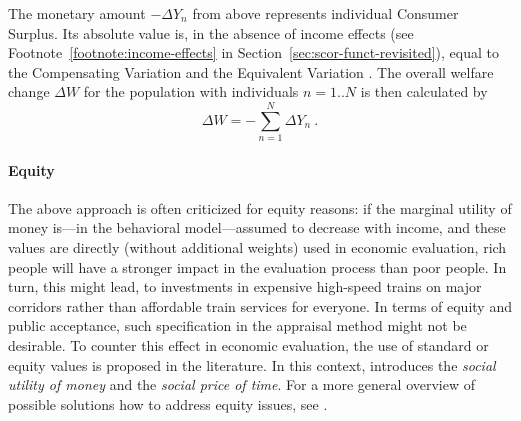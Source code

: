 
The monetary amount $ - \Delta Y_n$ from above represents individual Consumer Surplus. Its absolute value is, in the absence of income effects (see Footnote~\ref{footnote:income-effects} in Section~\ref{sec:scor-funct-revisited}), equal to the Compensating Variation and the Equivalent Variation \citep{DalyEtAl2008WelfareMeasuresIncome}.
%
The overall welfare change $\Delta W$ for the population with individuals $n=1..N$ is then calculated by
%
\begin{equation}
\label{eq:ch:economicEval:monetizationWtPAggregate}
\Delta W =  - \sum_{n=1}^N \Delta Y_n \ .
\end{equation}

\paragraph*{Equity}

The above approach is often criticized for equity reasons: if the marginal utility of money is---in the behavioral model---assumed to decrease with income, and these values are directly (without additional weights) used in economic evaluation, rich people will have a stronger impact in the evaluation process than poor people. In turn, this might lead, \eg to investments in expensive high-speed trains on major corridors rather than affordable train services for everyone. In terms of equity and public acceptance, such specification in the appraisal method might not be desirable.
%
To counter this effect in economic evaluation, the use of standard or equity values is proposed in the literature. In this context, \citet[][p.106ff]{JaraDiaz2007TransportEconomicTheory} introduces the \emph{social utility of money} and the \emph{social price of time}. For a more general overview of possible solutions how to address equity issues, see \citet{RizziSteinmetz2015VOTIncomePreferenceEquity}.

